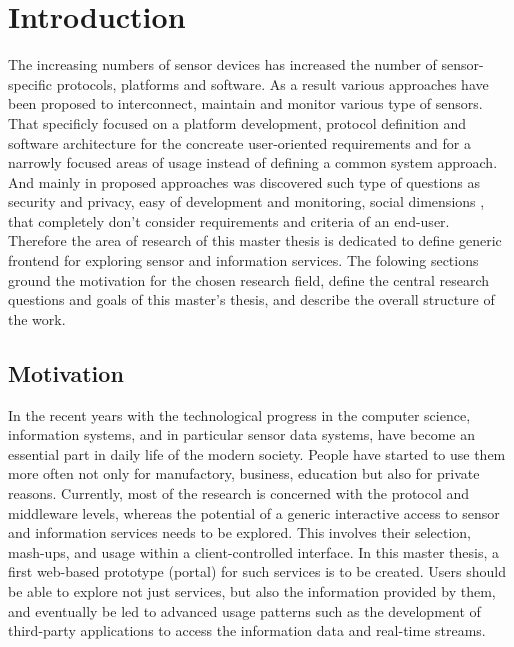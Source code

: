 
\chapter{Introduction}

  \begin{singlespace}
     The increasing numbers of sensor devices has increased the number of sensor-specific protocols, platforms and software. As a result various approaches have been proposed to interconnect, maintain and monitor various type of sensors\cite{6588063,bendel2013service,song2010real}. That specificly focused on a platform development, protocol definition and software architecture for the concreate user-oriented requirements and for a narrowly focused areas of usage instead of defining a common system approach. And mainly in proposed approaches was discovered such type of questions as security and privacy, easy of development and monitoring, social dimensions \cite{eggert2013sensorcloud}, that completely don't consider requirements and criteria of an end-user. Therefore the area of research of this master thesis is dedicated to define generic frontend for exploring sensor and information services.
     The folowing sections ground the motivation for the chosen research field, define the central research questions and goals of this master's thesis, and describe the overall structure of the work.
  \end{singlespace}

\section{Motivation}
     In the recent years with the technological progress in the computer science, information systems, and in particular sensor data systems, have become an essential part in daily life of the modern society. People have started to use them more often not only for manufactory, business, education but also for private reasons.
     Currently, most of the research is concerned with the protocol and middleware levels, whereas
     the potential of a generic interactive access to sensor and information services needs to be explored. 
     This involves their selection, mash-ups, and usage within a client-controlled interface.
     In this master thesis, a first web-based prototype (portal) for such services is to be
     created. Users should be able to explore not just services, but also the information provided by
     them, and eventually be led to advanced usage patterns such as the development
     of third-party applications to access the information data and real-time streams.

